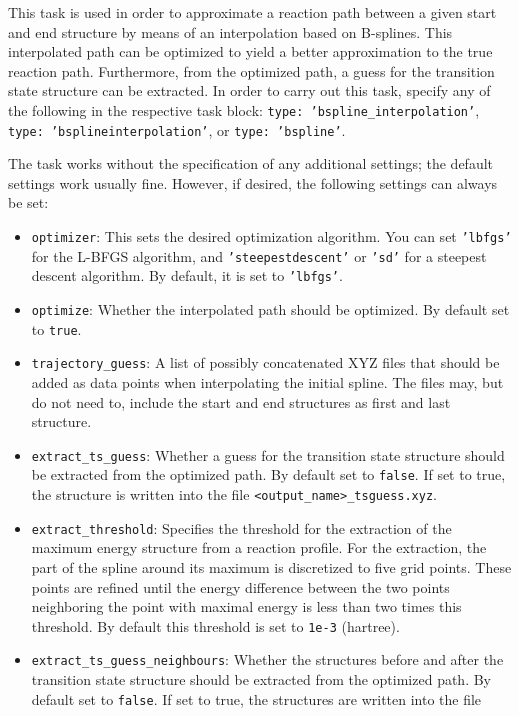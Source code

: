 \documentclass[]{tufte-book}
\begin{document}
This task is used in order to approximate a reaction path between a given start and end structure by means of an
interpolation based on B-splines\cite{bsplines}. This interpolated path can be optimized to yield a better approximation
to the true reaction path. Furthermore, from the optimized path, a guess for the transition state structure can be
extracted. In order to carry out this task, specify any of the following in the respective task block: \texttt{type: 'bspline\_interpolation'},
\texttt{type: 'bsplineinterpolation'}, or \texttt{type: 'bspline'}.

The task works without the specification of any additional settings; the default settings work usually fine. However,
if desired, the following settings can always be set:
\begin{itemize}
\item \texttt{optimizer}: This sets the desired optimization algorithm. You can set \texttt{'lbfgs'} for the L-BFGS algorithm, and
\texttt{'steepestdescent'} or \texttt{'sd'} for a steepest descent algorithm. By default, it is set to \texttt{'lbfgs'}.
\item \texttt{optimize}: Whether the interpolated path should be optimized. By default set to \texttt{true}.
\item \texttt{trajectory\_guess}: A list of possibly concatenated XYZ files that should be added as data points when interpolating
the initial spline. The files may, but do not need to, include the start and end structures as first and last structure.
\item \texttt{extract\_ts\_guess}:  Whether a guess for the transition state structure should be extracted from the optimized
path. By default set to \texttt{false}. If set to true, the structure is written into the file \texttt{<output\_name>\_tsguess.xyz}.
\item \texttt{extract\_threshold}: Specifies the threshold for the extraction of the maximum energy structure from a
reaction profile. For the extraction, the part of the spline around its maximum is discretized to five grid points. These
points are refined until the energy difference between the two points neighboring the point with maximal energy is less
than two times this threshold. By default this threshold is set to \texttt{1e-3} (hartree).
\item \texttt{extract\_ts\_guess\_neighbours}: Whether the structures before and after the transition state structure should be
extracted from the optimized path. By default set to \texttt{false}. If set to true, the structures are written into the file

\end{itemize}
\end{document}
